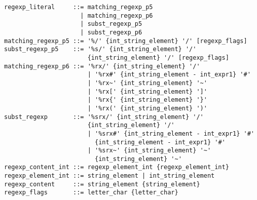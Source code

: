 \syntax\begin{lstlisting}
regexp_literal     ::= matching_regexp_p5
                     | matching_regexp_p6
                     | subst_regexp_p5
                     | subst_regexp_p6
matching_regexp_p5 ::= '%/' {int_string_element} '/' [regexp_flags]
subst_regexp_p5    ::= '%s/' {int_string_element} '/' 
                       {int_string_element} '/' [regexp_flags]
matching_regexp_p6 ::= '%rx/' {int_string_element} '/'
	                   | '%rx#' {int_string_element - int_expr1} '#'
	                   | '%rx~' {int_string_element} '~'
	                   | '%rx[' {int_string_element} ']'
	                   | '%rx{' {int_string_element} '}'
	                   | '%rx(' {int_string_element} ')'
subst_regexp       ::= '%srx/' {int_string_element} '/'
                       {int_string_element} '/'
	                   | '%srx#' {int_string_element - int_expr1} '#'
	                     {int_string_element - int_expr1} '#'
	                   | '%srx~' {int_string_element} '~'
	                     {int_string_element} '~'
regexp_content_int ::= regexp_element_int {regexp_element_int}
regexp_element_int ::= string_element | int_string_element
regexp_content     ::= string_element {string_element}
regexp_flags       ::= letter_char {letter_char}
\end{lstlisting}













